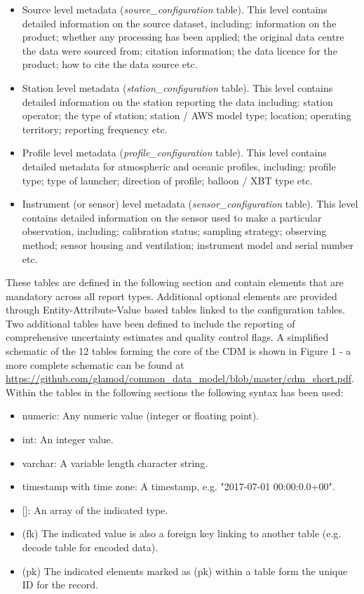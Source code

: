 \documentclass[a4paper,11pt]{article}
\begin{document}
\begin{itemize}
\item Source level metadata (\textit{source\_configuration} table). This level contains detailed information on the source dataset, including: information on the product; whether any processing has been applied; the original data centre the data were sourced from; citation information; the data licence for the product; how to cite the data source etc.
\item Station level metadata (\textit{station\_configuration} table). This level contains detailed information on the station reporting the data including: station operator; the type of station; station / AWS model type; location; operating territory; reporting frequency etc.
\item Profile level metadata (\textit{profile\_configuration} table). This level contains detailed metadata for atmospheric and oceanic profiles, including: profile type; type of launcher; direction of profile; balloon / XBT type etc.
\item Instrument (or sensor) level metadata (\textit{sensor\_configuration} table). This level contains detailed information on the sensor used to make a particular observation, including: calibration status; sampling strategy; observing method; sensor housing and ventilation; instrument model and serial number etc.
\end{itemize}

These tables are defined in the following section and contain elements that are mandatory across all report types. Additional optional elements are provided through Entity-Attribute-Value based tables linked to the configuration tables. Two additional tables have been defined to include the reporting of comprehensive uncertainty estimates and quality control flags. A simplified schematic of the 12 tables forming the core of the CDM is shown in Figure 1 - a more complete schematic can be found at \url{https://github.com/glamod/common_data_model/blob/master/cdm_short.pdf}. \\

Within the tables in the following sections the following syntax has been used:\\
\begin{itemize}
\item numeric: \tabto{3 cm} Any numeric value (integer or floating point).
\item int: \tabto{3 cm} An integer value.
\item varchar: \tabto{3 cm} A variable length character string.
\item timestamp with time zone: \tabto{3 cm} A timestamp, e.g. "2017-07-01 00:00:0.0+00".
\item {[]}:\tabto{3 cm} An array of the indicated type.
\item (fk) \tabto{3 cm} The indicated value is also a foreign key linking to another table (e.g. decode table for encoded data).
\item (pk) \tabto{3 cm} The indicated elements marked as (pk) within a table form the unique ID for the record.
\end {itemize}
\end{document}
